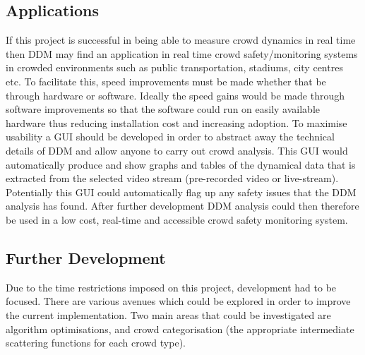 \documentclass[11pt]{article}
\begin{document}
\subsection{Applications}
If this project is successful in being able to measure crowd dynamics in real time then DDM may find an application in real time crowd safety/monitoring systems in crowded environments such as public transportation, stadiums, city centres etc. To facilitate this, speed improvements must be made whether that be through hardware or software. Ideally the speed gains would be made through software improvements so that the software could run on easily available hardware thus reducing installation cost and increasing adoption. To maximise usability a GUI should be developed in order to abstract away the technical details of DDM and allow anyone to carry out crowd analysis. This GUI would automatically produce and show graphs and tables of the dynamical data that is extracted from the selected video stream (pre-recorded video or live-stream). Potentially this GUI could automatically flag up any safety issues that the DDM analysis has found. After further development DDM analysis could then therefore be used in a low cost, real-time and accessible crowd safety monitoring system.

\subsection{Further Development}
Due to the time restrictions imposed on this project, development had to be focused. There are various avenues which could be explored in order to improve the current implementation. Two main areas that could be investigated are algorithm optimisations, and crowd categorisation (the appropriate intermediate scattering functions for each crowd type).
\end{document}
